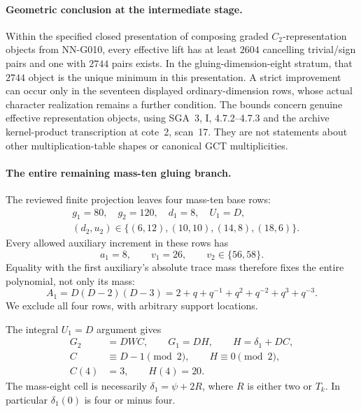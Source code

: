 \paragraph{Geometric conclusion at the intermediate stage.}
Within the specified closed presentation of composing graded
$C_2$-representation objects from NN-G010, every effective
lift has at least $2604$ cancelling trivial/sign pairs and
one with $2744$ pairs exists. In the gluing-dimension-eight
stratum, that $2744$ object is the unique minimum in this
presentation. A strict improvement can occur only in the
seventeen displayed ordinary-dimension rows, whose actual
character realization remains a further condition.
The bounds concern genuine effective representation objects,
using SGA~3, I, 4.7.2--4.7.3 and the archive kernel-product
transcription at cote~2, scan~17. They are not statements
about other multiplication-table shapes or canonical GCT
multiplicities.


\paragraph{The entire remaining mass-ten gluing branch.}
The reviewed finite projection leaves four mass-ten base rows:
\[
 \begin{aligned}
 &g_1=80,\quad g_2=120,\quad d_1=8,\quad U_1=D,\\
 &(d_2,u_2)\in\{(6,12),(10,10),(14,8),(18,6)\}.
 \end{aligned}
\]
Every allowed auxiliary increment in these rows has
\[
 a_1=8,\qquad v_1=26,\qquad v_2\in\{56,58\}.
\]
Equality with the first auxiliary's absolute trace mass
therefore fixes the entire polynomial, not only its mass:
\[
 A_1=D(D-2)(D-3)
   =2+q+q^{-1}+q^2+q^{-2}+q^3+q^{-3}.                 \tag{G036.T1}
\]
We exclude all four rows, with arbitrary support locations.

The integral $U_1=D$ argument gives
\[
 \begin{aligned}
 G_2&=DWC,\qquad G_1=DH,\qquad H=\delta_1+DC,\\
 C&\equiv D-1\pmod2,\qquad H\equiv0\pmod2,\\
 C(4)&=3,\qquad H(4)=20.
 \end{aligned}                                                   \tag{G036.T2}
\]
The mass-eight cell is necessarily
$\delta_1=\psi+2R$, where $R$ is either two or $T_k$.
In particular $\delta_1(0)$ is four or minus four.

